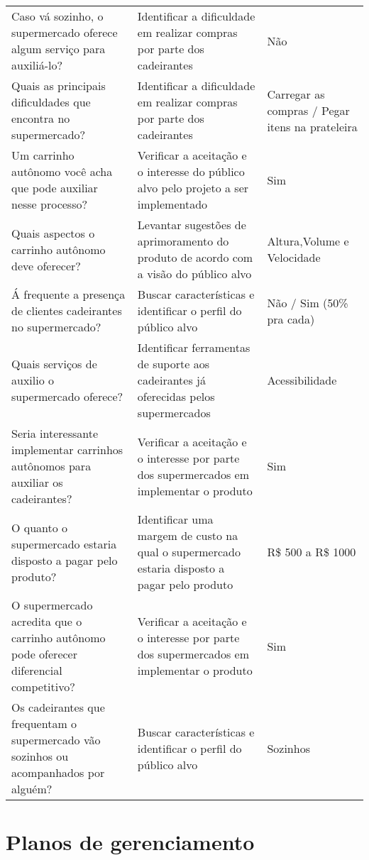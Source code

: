 \begin{apendicesenv}
\begin{sidewaystable}[]
{\begin{tabular}{lll}
Caso vá sozinho, o supermercado oferece algum serviço para auxiliá-lo?                 & Identificar a dificuldade em realizar compras por parte dos cadeirantes                      & Não                                             \\
Quais as principais dificuldades que encontra no supermercado?                         & Identificar a dificuldade em realizar compras por parte dos cadeirantes                      & Carregar as compras / Pegar itens na prateleira \\
Um carrinho autônomo você acha que pode auxiliar nesse processo?                       & Verificar a aceitação e o interesse do público alvo pelo projeto a ser implementado          & Sim                                             \\
Quais aspectos o carrinho autônomo deve oferecer?                                      & Levantar sugestões de aprimoramento do produto de acordo com a visão do público alvo         & Altura,Volume e Velocidade                      \\
Á frequente a presença de clientes cadeirantes no supermercado?                        & Buscar características e identificar o perfil do público alvo                                & Não / Sim (50\% pra cada)                       \\
Quais serviços de auxilio o supermercado oferece?                                      & Identificar ferramentas de suporte aos cadeirantes já oferecidas pelos supermercados         & Acessibilidade                                  \\
Seria interessante implementar carrinhos autônomos para auxiliar os cadeirantes?       & Verificar a aceitação e o interesse por parte dos supermercados em implementar o produto     & Sim                                             \\
O quanto o supermercado estaria disposto a pagar pelo produto?                         & Identificar uma margem de custo na qual o supermercado estaria disposto a pagar pelo produto & R\$ 500 a R\$ 1000                                \\
O supermercado acredita que o carrinho autônomo pode oferecer diferencial competitivo? & Verificar a aceitação e o interesse por parte dos supermercados em implementar o produto     & Sim                                             \\
Os cadeirantes que frequentam o supermercado vão sozinhos ou acompanhados por alguém?  & Buscar características e identificar o perfil do público alvo                                & Sozinhos                                       
\end{tabular}}
\end{sidewaystable}


\chapter{Planos de gerenciamento} \label{appendix:planos}




\end{apendicesenv}
